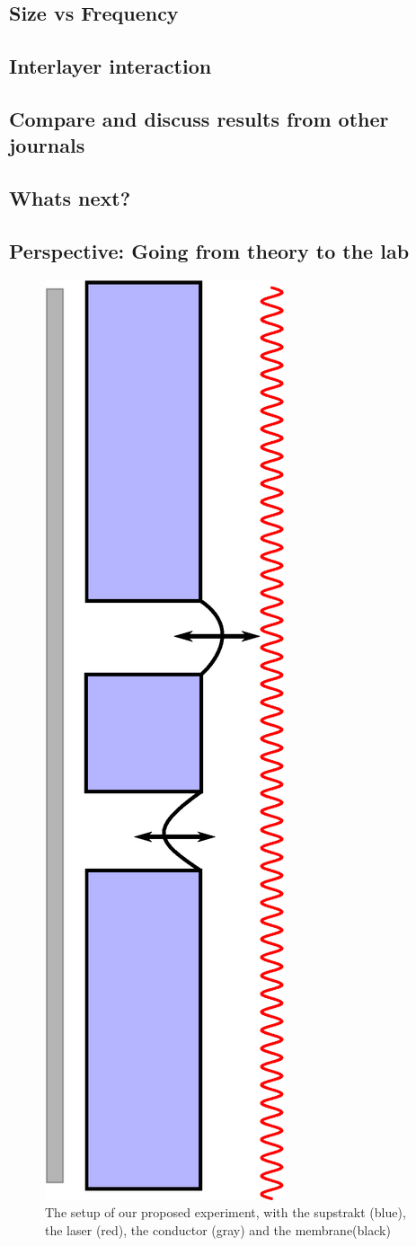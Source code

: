 \subsection{Size vs Frequency}

\subsection{Interlayer interaction}

\subsection{Compare and discuss results from other journals}

\subsection{Whats next?}

\subsection{Perspective: Going from theory to the lab}

\begin{figure}
  \centering
  \includegraphics[width=0.3\columnwidth]{Figures/Fuck_dig_christoffer.eps}
  \caption{The setup of our proposed experiment, with the supstrakt (blue), the laser (red), the conductor (gray) and the membrane(black)}
  \label{FDC}
\end{figure}